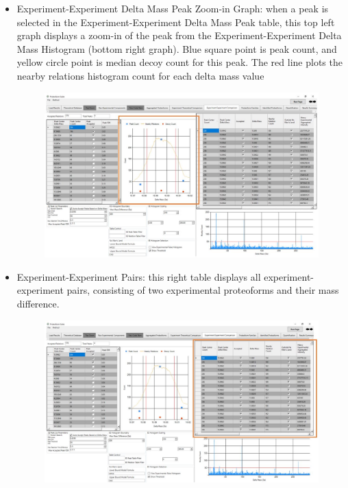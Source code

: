 \begin{itemize}
\begin{itemize}
		\end{itemize}
	\item Experiment-Experiment Delta Mass Peak Zoom-in Graph: when a peak is selected in the Experiment-Experiment Delta Mass Peak table, this top left graph displays a zoom-in of the peak from the Experiment-Experiment Delta Mass Histogram (bottom right graph). Blue square point is peak count, and yellow circle point is median decoy count for this peak. The red line plots the nearby relations histogram count for each delta mass value
		\begin{figure}[h]
\centering
\includegraphics[scale=0.44]{figures/ee3.jpg}
\end{figure}
\pagebreak
\item {Experiment-Experiment Pairs}: this right table displays all experiment-experiment pairs, consisting of two experimental proteoforms and their mass difference.
		\begin{figure}[h]
\centering
\includegraphics[scale=0.44]{figures/ee4.jpg}
\end{figure}

\end{itemize}
